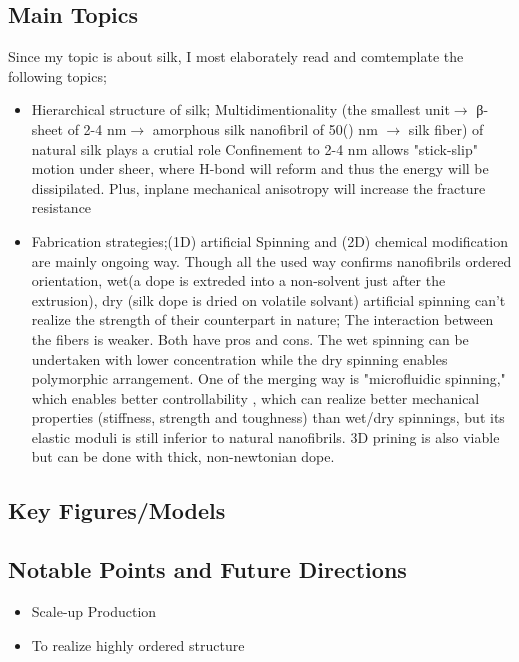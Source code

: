 \documentclass{ltjsarticle}
\numberwithin{equation}{subsection}
\begin{document}
\subsection{Main Topics}
Since my topic is about silk, I most elaborately read and comtemplate the following topics;
\begin{itemize}
  \item Hierarchical structure of silk; Multidimentionality (the smallest unit$\to$ β-sheet of 2-4 nm$\to$ amorphous silk nanofibril of 50() nm $\to$ silk fiber) of natural silk plays a crutial role
  Confinement to 2-4 nm allows "stick-slip" motion under sheer, where H-bond will reform and thus the energy will be dissipilated.
  Plus, inplane mechanical anisotropy will increase the fracture resistance
  \item Fabrication strategies;(1D) artificial Spinning and (2D) chemical modification are mainly ongoing way. 
  Though all the used way confirms nanofibrils ordered orientation,  wet(a dope is extreded into a non-solvent just after the extrusion), dry (silk dope is dried on volatile solvant) artificial spinning can't realize the strength of their counterpart in nature;
   The interaction between the fibers is weaker. Both have pros and cons. 
   The wet spinning can be undertaken with lower concentration while the dry spinning enables polymorphic arrangement.
    One of the merging way is "microfluidic spinning," which enables better controllability
    , which can realize better mechanical properties (stiffness, strength and toughness) than wet/dry spinnings, but its elastic moduli is still inferior to natural nanofibrils.
    3D prining is also viable but can be done with thick, non-newtonian dope.
\end{itemize}

\subsection{Key Figures/Models}

\subsection{Notable Points and Future Directions}
\begin{itemize}
    \item Scale-up Production
    \item To realize highly ordered structure
\end{itemize}
\end{document}
